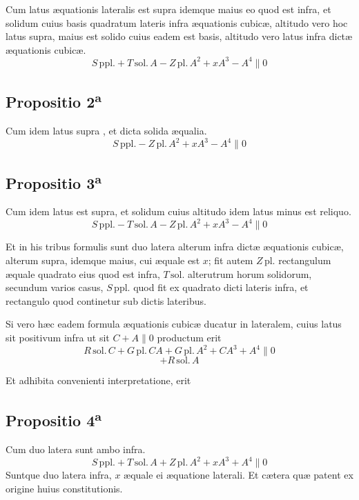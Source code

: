 \documentclass[11pt,a4paper]{article}
\begin{document}
Cum latus æquationis lateralis est supra idemque maius eo quod est infra, et solidum cuius basis quadratum lateris infra æquationis cubicæ, altitudo vero hoc latus supra, maius est solido cuius eadem est basis, altitudo vero latus infra dictæ æquationis cubicæ.
\[ S\,\mathrm{ppl.} + T\,\mathrm{sol.}\,A - Z\,\mathrm{pl.}\,A^2 + x A^3 - A^4 \parallel 0 \]

\subsection*{Propositio 2\textsuperscript{a}}

Cum idem latus  supra , et dicta solida æqualia.
\[ S\,\mathrm{ppl.} - Z\,\mathrm{pl.}\,A^2 + x A^3 - A^4 \parallel 0 \]

\subsection*{Propositio 3\textsuperscript{a}}

Cum idem latus est supra, et solidum cuius altitudo idem latus minus est reliquo.
\[ S\,\mathrm{ppl.} - T\,\mathrm{sol.}\,A - Z\,\mathrm{pl.}\,A^2 + x A^3 - A^4 \parallel 0 \]

Et in his tribus formulis sunt duo latera alterum infra dictæ æquationis cubicæ, alterum supra, idemque maius, cui æquale est $x$; fit autem $Z\,\mathrm{pl.}$ rectangulum æquale quadrato eius quod est infra, $T\,\mathrm{sol.}$ alterutrum horum solidorum, secundum varios casus, $S\,\mathrm{ppl.}$ quod fit ex quadrato dicti lateris infra, et rectangulo quod continetur sub dictis lateribus.

Si vero hæc eadem formula æquationis cubicæ ducatur in lateralem, cuius latus sit positivum infra ut sit $C + A \parallel 0$ productum erit
\[ R\,\mathrm{sol.}\,C + G\,\mathrm{pl.}\,C A + G\,\mathrm{pl.}\,A^2 + C A^3 + A^4 \parallel 0 \]
\[ + R\,\mathrm{sol.}\,A \]

Et adhibita convenienti interpretatione, erit

\subsection*{Propositio 4\textsuperscript{a}}

Cum duo latera sunt ambo infra.
\[ S\,\mathrm{ppl.} + T\,\mathrm{sol.}\,A + Z\,\mathrm{pl.}\,A^2 + x A^3 + A^4 \parallel 0 \]
Suntque duo latera infra, $x$ æquale ei  æquatione laterali. Et cætera quæ patent ex origine huius constitutionis.
\end{document}
